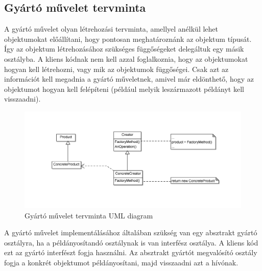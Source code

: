 \documentclass[a4paper,12pt]{report}
\begin{document}
\subsection{Gyártó művelet tervminta}
A gyártó művelet olyan létrehozási tervminta, amellyel anélkül lehet objektumokat előállítani, hogy pontosan meghatároznánk az objektum típusát. Így az objektum létrehozásához szükséges függőségeket delegáltuk egy másik osztályba. A kliens kódnak nem kell azzal foglalkoznia, hogy az objektumokat hogyan kell létrehozni, vagy mik az objektumok függőségei. Csak azt az információt kell megadnia a gyártó műveletnek, amivel már eldönthető, hogy az objektumot hogyan kell felépíteni (például melyik leszármazott példányt kell visszaadni).

\begin{figure}
	\caption{Gyártó művelet tervminta  UML diagram}
	\centering
	\includegraphics[width=15cm,keepaspectratio]{factory_method.png}
\end{figure}

A gyártó művelet implementálásához általában szükség van egy absztrakt gyártó osztályra, ha a példányosítandó osztálynak is van interfész osztálya. A kliens kód ezt az gyártó interfészt fogja használni. Az absztrakt gyártót megvalósító osztály  fogja a konkrét objektumot példányosítani, majd visszaadni azt a hívónak.
\end{document}
